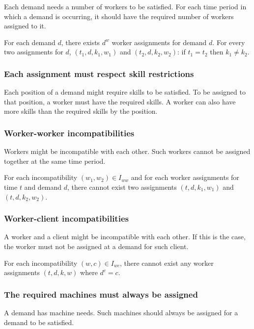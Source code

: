 \documentclass[../thesis.tex]{subfiles}
\begin{document}
Each demand needs a number of workers to be satisfied. 
For each time period in which a demand is occurring, it should have the required 
number of workers assigned to it.

For each demand $d$, there exists $d^w$ worker assignments for demand $d$. 
For every two assignments for $d$, $(t_1, d, k_1, w_1)$ and $(t_2, d, k_2, w_2)$: if $t_1 = t_2$ then $k_1 \neq k_2$.

\subsubsection{Each assignment must respect skill restrictions}

Each position of a demand might require skills to be satisfied. 
To be assigned to that position, a worker must have the required skills. 
A worker can also have more skills than the required skills by the position.

\subsubsection{Worker-worker incompatibilities}

Workers might be incompatible with each other. Such workers cannot
be assigned together at the same time period.

For each incompatibility $(w_1, w_2) \in I_{ww}$ and for each worker assignments for time $t$ and demand $d$,
there cannot exist two assignments $(t, d, k_1, w_1)$ and $(t, d, k_2, w_2)$.

\subsubsection{Worker-client incompatibilities}

A worker and a client might be incompatible with each other. 
If this is the case, the worker must not be assigned at a demand for such client.

For each incompatibility $(w, c) \in I_{wc}$, there cannot exist any worker assignments $(t, d, k, w)$ where 
$d^c = c$.

\subsubsection{The required machines must always be assigned}

A demand has machine needs. Such machines should always be assigned 
for a demand to be satisfied.
\end{document}
